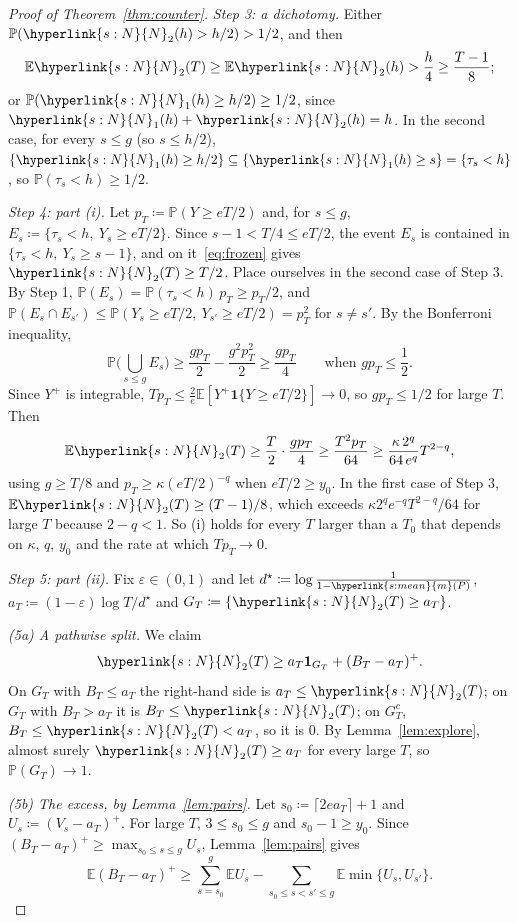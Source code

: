 \documentclass[11pt]{article}
\newcommand{\E}{\mathbb{E}}
\newcommand{\Prob}{\mathbb{P}}
\newcommand{\ind}{\mathbf{1}}
\newcommand{\sy}[2]{{\hyperlink{#1}{#2}}}
\newcommand{\mean}{\sy{s:mean}{m}}
\newcommand{\Np}{\sy{s:N}{N}}
\begin{document}
\begin{proof}[Proof of Theorem~\ref{thm:counter}]
\emph{Step 3: a dichotomy.} Either $\Prob(\Np_2(h)>h/2)>1/2$, and then
\[
  \E \Np_2(T)\ge\E \Np_2(h)>\frac h4\ge\frac{T-1}{8};
\]
or $\Prob(\Np_1(h)\ge h/2)\ge1/2$, since $\Np_1(h)+\Np_2(h)=h$. In the second case, for every $s\le g$
(so $s\le h/2$), $\{\Np_1(h)\ge h/2\}\subseteq\{\Np_1(h)\ge s\}=\{\tau_s<h\}$, so
$\Prob(\tau_s<h)\ge1/2$.

\emph{Step 4: part (i).} Let $p_T\coloneqq\Prob(Y\ge eT/2)$ and, for $s\le g$,
$E_s\coloneqq\{\tau_s<h,\ Y_s\ge eT/2\}$. Since $s-1<T/4\le eT/2$, the event $E_s$ is contained in
$\{\tau_s<h,\ Y_s\ge s-1\}$, and on it~\eqref{eq:frozen} gives $\Np_2(T)\ge T/2$. Place ourselves in
the second case of Step 3. By Step 1, $\Prob(E_s)=\Prob(\tau_s<h)\,p_T\ge p_T/2$, and
$\Prob(E_s\cap E_{s'})\le\Prob(Y_s\ge eT/2,\ Y_{s'}\ge eT/2)=p_T^2$ for $s\ne s'$. By the Bonferroni
inequality,
\[
  \Prob\Big(\bigcup_{s\le g}E_s\Big)\ge\frac{gp_T}{2}-\frac{g^2p_T^2}{2}\ge\frac{gp_T}{4}\qquad\text{when }gp_T\le\frac12.
\]
Since $Y^+$ is integrable, $Tp_T\le\frac2e\E[Y^+\ind\{Y\ge eT/2\}]\to0$, so $gp_T\le1/2$ for large
$T$. Then
\[
  \E \Np_2(T)\ge\frac T2\cdot\frac{gp_T}{4}\ge\frac{T^2p_T}{64}\ge\frac{\kappa\,2^q}{64\,e^q}T^{2-q},
\]
using $g\ge T/8$ and $p_T\ge\kappa(eT/2)^{-q}$ when $eT/2\ge y_0$. In the first case of Step 3,
$\E \Np_2(T)\ge(T-1)/8$, which exceeds $\kappa2^qe^{-q}T^{2-q}/64$ for large $T$ because $2-q<1$.
So (i) holds for every $T$ larger than a $T_0$ that depends on $\kappa$, $q$, $y_0$ and the rate at
which $Tp_T\to0$.

\emph{Step 5: part (ii).} Fix $\varepsilon\in(0,1)$ and let $d^\star\coloneqq\log\frac1{1-\mean(P)}$,
$a_T\coloneqq(1-\varepsilon)\log T/d^\star$ and $G_T\coloneqq\{\Np_2(T)\ge a_T\}$.

\emph{(5a) A pathwise split.} We claim
\[
  \Np_2(T)\ge a_T\ind_{G_T}+(B_T-a_T)^+.
\]
On $G_T$ with $B_T\le a_T$ the right-hand side is $a_T\le \Np_2(T)$; on $G_T$ with $B_T>a_T$ it is
$B_T\le \Np_2(T)$; on $G_T^c$, $B_T\le \Np_2(T)<a_T$, so it is $0$. By Lemma~\ref{lem:explore}, almost
surely $\Np_2(T)\ge a_T$ for every large $T$, so $\Prob(G_T)\to1$.

\emph{(5b) The excess, by Lemma~\ref{lem:pairs}.} Let $s_0\coloneqq\lceil2ea_T\rceil+1$ and
$U_s\coloneqq(V_s-a_T)^+$. For large $T$, $3\le s_0\le g$ and $s_0-1\ge y_0$. Since
$(B_T-a_T)^+\ge\max_{s_0\le s\le g}U_s$, Lemma~\ref{lem:pairs} gives
\[
  \E(B_T-a_T)^+\ge\sum_{s=s_0}^g\E U_s-\sum_{s_0\le s<s'\le g}\E\min\{U_s,U_{s'}\}.
\]


\end{proof}
\end{document}
